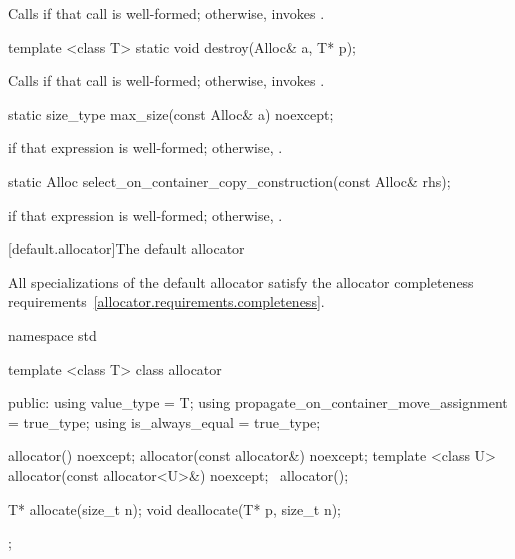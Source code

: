 \begin{itemdescr}
\pnum
\effects Calls 
if that call is well-formed;
otherwise, invokes .
\end{itemdescr}

%
\begin{itemdecl}
template <class T>
  static void destroy(Alloc& a, T* p);
\end{itemdecl}

\begin{itemdescr}
\pnum
\effects Calls  if that call is well-formed; otherwise, invokes
.
\end{itemdescr}

%
\begin{itemdecl}
static size_type max_size(const Alloc& a) noexcept;
\end{itemdecl}

\begin{itemdescr}
\pnum
\returns {} if that expression is well-formed; otherwise,
.
\end{itemdescr}

%
\begin{itemdecl}
static Alloc select_on_container_copy_construction(const Alloc& rhs);
\end{itemdecl}

\begin{itemdescr}
\pnum
\returns {} if that expression is
well-formed; otherwise, .
\end{itemdescr}

[default.allocator]{The default allocator}

\pnum
All specializations of the default allocator satisfy the
allocator completeness requirements~\ref{allocator.requirements.completeness}.

%
\begin{codeblock}
namespace std {
  template <class T> class allocator {
   public:
    using value_type      = T;
    using propagate_on_container_move_assignment = true_type;
    using is_always_equal = true_type;

    allocator() noexcept;
    allocator(const allocator&) noexcept;
    template <class U> allocator(const allocator<U>&) noexcept;
   ~allocator();

    T* allocate(size_t n);
    void deallocate(T* p, size_t n);
  };
}
\end{codeblock}

